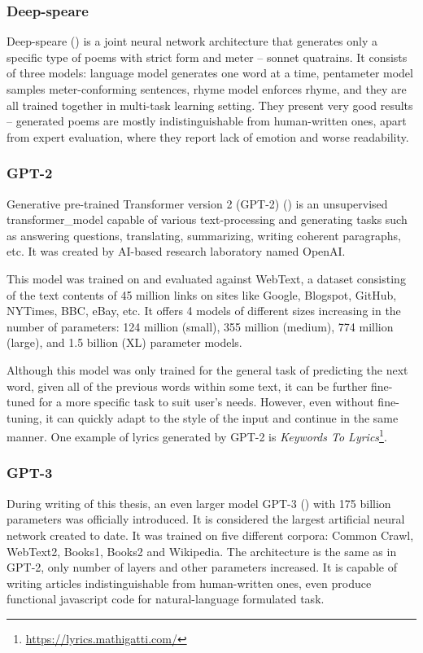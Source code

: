 \subsubsection*{Deep-speare}
Deep-speare (\cite{lau2018deep}) is a joint neural network architecture that generates only a specific type of poems with strict form and meter -- \gls{sonnet} \gls{quatrain}s. It consists of three models: language model generates one word at a time, pentameter model samples meter-conforming sentences, rhyme model enforces rhyme, and they are all trained together in multi-task learning setting. They present very good results -- generated poems are mostly indistinguishable from human-written ones, apart from expert evaluation, where they report lack of emotion and worse readability.

\subsubsection*{GPT-2}
Generative pre-trained Transformer version 2 (GPT-2) (\cite{radford2019gpt2}) is an unsupervised \gls{transformer_model} capable of various text-processing and generating tasks such as answering questions, translating, summarizing, writing coherent paragraphs, etc. It was created by AI-based research laboratory named OpenAI.

This model was trained on and evaluated against WebText, a dataset consisting of the text contents of 45 million links on sites like Google, Blogspot, GitHub, NYTimes, BBC, eBay, etc. It offers 4 models of different sizes increasing in the number of parameters: 124 million (small), 355 million (medium), 774 million (large), and 1.5 billion (XL) parameter models.

Although this model was only trained for the general task of predicting the next word, given all of the previous words within some text, it can be further fine-tuned for a more specific task to suit user's needs. However, even without fine-tuning, it can quickly adapt to the style of the input and continue in the same manner. One example of lyrics generated by GPT-2 is \textit{Keywords To Lyrics}\footnote{\url{https://lyrics.mathigatti.com/}}.

\subsubsection*{GPT-3}
During writing of this thesis, an even larger model GPT-3 (\cite{brown2020gpt3}) with 175 billion parameters was officially introduced. It is considered the largest artificial neural network created to date. It was trained on five different corpora: Common Crawl, WebText2, Books1, Books2 and Wikipedia. The architecture is the same as in GPT-2, only number of layers and other parameters increased. It is capable of writing articles indistinguishable from human-written ones, even produce functional javascript code for natural-language formulated task.

